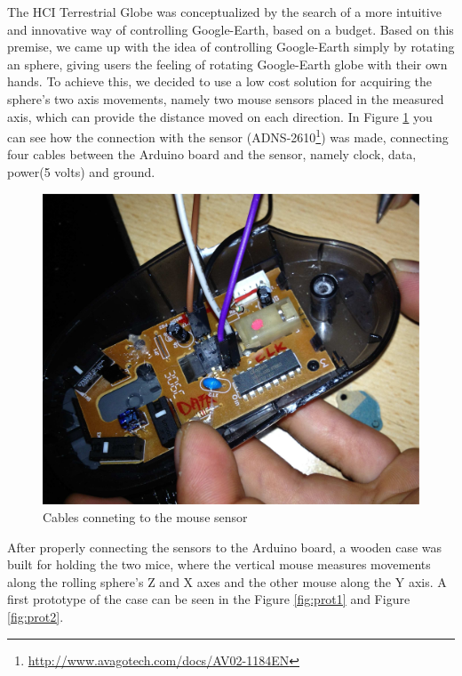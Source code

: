 \documentclass[12pt]{article}
\begin{document}
The HCI Terrestrial Globe was conceptualized by the search of a more intuitive and innovative way of controlling Google-Earth, based on a  budget. Based on this premise, we came up with the idea of controlling Google-Earth simply by rotating an sphere, giving users the feeling of rotating Google-Earth globe with their own hands. To achieve this, we decided to use a low cost solution for acquiring the sphere's two axis movements, namely two mouse sensors placed in the measured axis, which can provide the distance moved on each direction. In Figure \ref{fig:mouse1} you can see how the connection with the sensor (ADNS-2610\footnote{\url{http://www.avagotech.com/docs/AV02-1184EN}}) was made, connecting four cables between the Arduino board and the sensor, namely clock, data, power(5 volts) and ground. 
\\
\begin{figure}[h]\centering
\includegraphics[scale=0.10]{mouse_sensor-eps-converted-to.pdf} 
\caption{Cables conneting to the mouse sensor}\centering 
\label{fig:mouse1}
\end{figure}	

After properly connecting the sensors to the Arduino board, a wooden case was built for holding the two mice, where the vertical mouse measures movements along the rolling sphere's Z and X axes and the other mouse along the Y axis. A first prototype of the case can be seen in the Figure \ref{fig:prot1} and Figure \ref{fig:prot2}.
\end{document}
